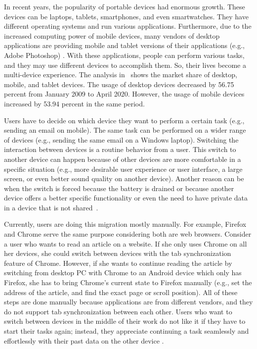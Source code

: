 In recent years, the popularity of portable devices had enormous growth.
These devices can be laptops, tablets, smartphones, and even smartwatches.
They have different operating systems and run various applications. Furthermore, due to the increased computing power of mobile devices, many vendors of desktop applications are providing mobile and tablet versions of their applications (e.g., Adobe Photoshop) \cite{cross-platform-appropriate-approach}.
With these applications, people can perform various tasks, and they may use different devices to accomplish them.
So, their lives become a multi-device experience.
The analysis in~\cite{device-market-share} shows the market share of desktop, mobile, and tablet devices.
The usage of desktop devices decreased by 56.75 percent from January 2009 to April 2020. 
However, the usage of mobile devices increased by 53.94 percent in the same period.


Users have to decide on which device they want to perform a certain task (e.g., sending an email on mobile).
The same task can be performed on a wider range of devices (e.g., sending the same email on a Windows laptop).
Switching the interaction between devices is a routine behavior from a user.
This switch to another device can happen because of other devices are more comfortable in a specific situation (e.g., more desirable user experience or user interface, a large screen, or even better sound quality on another device).
Another reason can be when the switch is forced because the battery is drained or because another device offers a better specific functionality or even the need to have private data in a device that is not shared~\cite{migratory-interactive}.


Currently, users are doing this migration mostly manually.
For example, Firefox and Chrome serve the same purpose considering both are web browsers. %
Consider a user who wants to read an article on a website. If she only uses Chrome on all her devices, she could switch between devices with the tab synchronization feature of Chrome. However, if she wants to continue reading the article by switching from desktop PC with Chrome to an Android device which only has Firefox, she has to bring Chrome's current state to Firefox manually (e.g., set the address of the article, and find the exact page or scroll position). All of these steps are done manually because applications are from different vendors, and they do not support tab synchronization between each other.
Users who want to switch between devices in the middle of their work do not like it if they have to start their tasks again; instead, they appreciate continuing a task seamlessly and effortlessly with their past data on the other device \cite{liquid-software, diary-study}.

